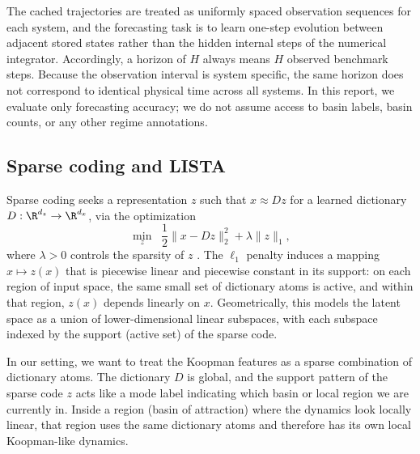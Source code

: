 \documentclass{article}
\begin{document}
The cached trajectories are treated as uniformly spaced observation sequences for each system, and the forecasting task is to learn one-step evolution between adjacent stored states rather than the hidden internal steps of the numerical integrator. Accordingly, a horizon of $H$ always means $H$ observed benchmark steps. Because the observation interval is system specific, the same horizon does not correspond to identical physical time across all systems. In this report, we evaluate only forecasting accuracy; we do not assume access to basin labels, basin counts, or any other regime annotations.

\subsection{Sparse coding and LISTA}
\label{sec:background-sparse}

Sparse coding seeks a representation $z$ such that $x \approx Dz$ for a learned dictionary $D : \R^{d_z} \to \R^{d_x}$, via the optimization
\begin{equation}
\min_z \;\; \frac{1}{2} \|x - D z\|_2^2 + \lambda \|z\|_1,
\end{equation}
where $\lambda > 0$ controls the sparsity of $z$ \citep{olshausen_emergence_1996, chen_atomic_1998, donoho_optimally_2003}.
The $\ell_1$ penalty induces a mapping $x \mapsto z(x)$ that is piecewise linear and piecewise constant in its support: on each region of input space, the same small set of dictionary atoms is active, and within that region, $z(x)$ depends linearly on $x$.
Geometrically, this models the latent space as a union of lower-dimensional linear subspaces, with each subspace indexed by the support (active set) of the sparse code.


In our setting, we want to treat the Koopman features as a sparse combination of dictionary atoms.
The dictionary $D$ is global, and the support pattern of the sparse code $z$ acts like a mode label indicating which basin or local region we are currently in.
Inside a region (basin of attraction) where the dynamics look locally linear, that region uses the same dictionary atoms and therefore has its own local Koopman-like dynamics.
\end{document}
